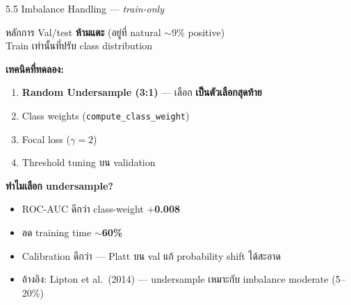 \documentclass[aspectratio=169,11pt,xcolor=dvipsnames]{beamer}
\newcommand{\hl}[1]{\textcolor{kmitlOrange}{\textbf{#1}}}
\begin{document}
\begin{frame}{5.5 Imbalance Handling — \emph{train-only}}
  \begin{block}{หลักการ}
    Val/test \hl{ห้ามแตะ} (อยู่ที่ natural $\sim$9\% positive)\\
    Train เท่านั้นที่ปรับ class distribution
  \end{block}

  \textbf{เทคนิคที่ทดลอง:}
  \begin{enumerate}
    \item \textbf{Random Undersample (3:1)} — เลือก \hl{เป็นตัวเลือกสุดท้าย}
    \item Class weights (\texttt{compute\_class\_weight})
    \item Focal loss ($\gamma = 2$)
    \item Threshold tuning บน validation
  \end{enumerate}

  \textbf{ทำไมเลือก undersample?}
  \begin{itemize}
    \item ROC-AUC ดีกว่า class-weight \hl{$+$0.008}
    \item ลด training time \hl{$\sim$60\%}
    \item Calibration ดีกว่า — Platt บน val แก้ probability shift ได้สะอาด
    \item อ้างอิง: Lipton et al.\ (2014) — undersample เหมาะกับ imbalance moderate (5--20\%)
  \end{itemize}
\end{frame}
\end{document}
